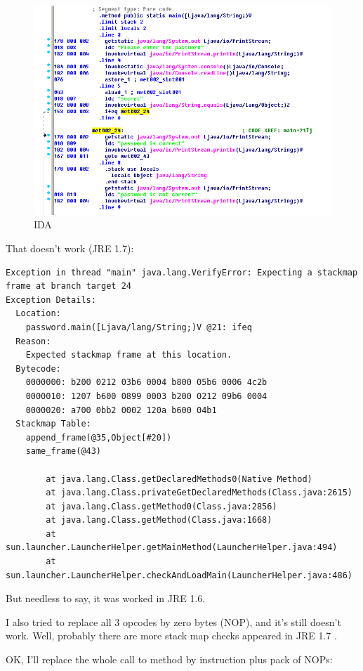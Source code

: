 \begin{figure}[H]
\centering
\includegraphics[scale=\FigScale]{Java_and_NET/java/13_patching/2/2.png}
\caption{IDA}
\end{figure}

That doesn't work (JRE 1.7):

\begin{lstlisting}
Exception in thread "main" java.lang.VerifyError: Expecting a stackmap frame at branch target 24
Exception Details:
  Location:
    password.main([Ljava/lang/String;)V @21: ifeq
  Reason:
    Expected stackmap frame at this location.
  Bytecode:
    0000000: b200 0212 03b6 0004 b800 05b6 0006 4c2b
    0000010: 1207 b600 0899 0003 b200 0212 09b6 0004
    0000020: a700 0bb2 0002 120a b600 04b1
  Stackmap Table:
    append_frame(@35,Object[#20])
    same_frame(@43)

        at java.lang.Class.getDeclaredMethods0(Native Method)
        at java.lang.Class.privateGetDeclaredMethods(Class.java:2615)
        at java.lang.Class.getMethod0(Class.java:2856)
        at java.lang.Class.getMethod(Class.java:1668)
        at sun.launcher.LauncherHelper.getMainMethod(LauncherHelper.java:494)
        at sun.launcher.LauncherHelper.checkAndLoadMain(LauncherHelper.java:486)
\end{lstlisting}

But needless to say, it was worked in JRE 1.6.

I also tried to replace all 3  opcodes by zero bytes (\ac{NOP}), 
and it's still doesn't work.
Well, probably there are more stack map checks appeared in JRE 1.7 .

OK, I'll replace the whole call to  method by  instruction 
plus pack of \ac{NOP}s:

